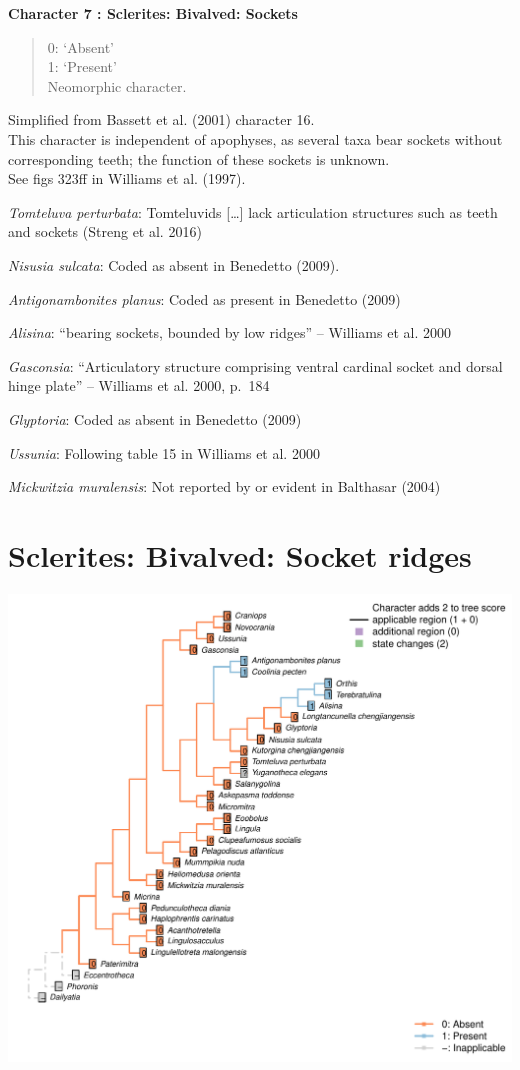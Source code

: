 \documentclass[]{book}
\theoremstyle{definition}
\theoremstyle{definition}
\theoremstyle{definition}
\theoremstyle{remark}
\begin{document}
\textbf{Character 7 : Sclerites: Bivalved: Sockets }

\begin{quote}
0: `Absent'\\
1: `Present'\\
Neomorphic character.
\end{quote}

Simplified from Bassett et al. (2001) character 16.\\
This character is independent of apophyses, as several taxa bear sockets
without corresponding teeth; the function of these sockets is unknown.\\
See figs 323ff in Williams et al. (1997).

\emph{Tomteluva perturbata}: Tomteluvids {[}\ldots{}{]} lack
articulation structures such as teeth and sockets (Streng et al. 2016)

\emph{Nisusia sulcata}: Coded as absent in Benedetto (2009).

\emph{Antigonambonites planus}: Coded as present in Benedetto (2009)

\emph{Alisina}: ``bearing sockets, bounded by low ridges'' -- Williams
et al. 2000

\emph{Gasconsia}: ``Articulatory structure comprising ventral cardinal
socket and dorsal hinge plate'' -- Williams et al. 2000, p.~184

\emph{Glyptoria}: Coded as absent in Benedetto (2009)

\emph{Ussunia}: Following table 15 in Williams et al. 2000

\emph{Mickwitzia muralensis}: Not reported by or evident in Balthasar
(2004)

\hypertarget{sclerites-bivalved-socket-ridges}{%
\section*{Sclerites: Bivalved: Socket
ridges}\label{sclerites-bivalved-socket-ridges}}

\includegraphics{Brachiopod_phylogeny_files/figure-latex/unnamed-chunk-5-8.pdf}
\end{document}

